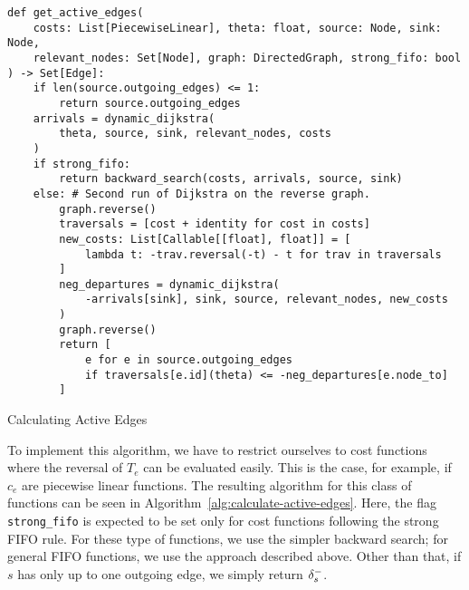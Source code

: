 \begin{algorithm}[h]
    \begin{verbatim}
def get_active_edges(
    costs: List[PiecewiseLinear], theta: float, source: Node, sink: Node,
    relevant_nodes: Set[Node], graph: DirectedGraph, strong_fifo: bool
) -> Set[Edge]:
    if len(source.outgoing_edges) <= 1:
        return source.outgoing_edges
    arrivals = dynamic_dijkstra(
        theta, source, sink, relevant_nodes, costs
    )
    if strong_fifo:
        return backward_search(costs, arrivals, source, sink)
    else: # Second run of Dijkstra on the reverse graph.
        graph.reverse()
        traversals = [cost + identity for cost in costs]
        new_costs: List[Callable[[float], float]] = [
            lambda t: -trav.reversal(-t) - t for trav in traversals
        ]
        neg_departures = dynamic_dijkstra(
            -arrivals[sink], sink, source, relevant_nodes, new_costs
        )
        graph.reverse()
        return [
            e for e in source.outgoing_edges
            if traversals[e.id](theta) <= -neg_departures[e.node_to]
        ]
    \end{verbatim}
    \caption{Calculating Active Edges}
    \label{alg:calculate-active-edges}
\end{algorithm}


To implement this algorithm, we have to restrict ourselves to cost functions where the reversal of $T_e$ can be evaluated easily.
This is the case, for example, if $c_e$ are piecewise linear functions.
The resulting algorithm for this class of functions can be seen in Algorithm~\ref{alg:calculate-active-edges}.
Here, the flag \texttt{strong\_fifo} is expected to be set only for cost functions following the strong FIFO rule.
For these type of functions, we use the simpler backward search; for  general FIFO functions, we use the approach described above.
Other than that, if $s$ has only up to one outgoing edge, we simply return $\delta^-_{s}$.
